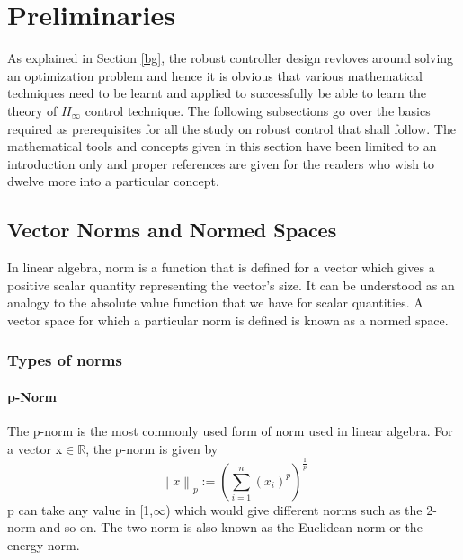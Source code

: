 \documentclass[a4paper,12pt]{article}
\newcommand\norm[1]{\left\lVert#1\right\rVert}
\begin{document}
\section{Preliminaries}

As explained in Section \ref{bg}, the robust controller design revloves around solving an optimization problem and hence it is obvious that various mathematical techniques need to be learnt and applied to successfully be able to learn the theory of $H_{\infty}$ control technique. The following subsections go over the basics required as prerequisites for all the study on robust control that shall follow. The mathematical tools and concepts given in this section have been limited to an introduction only and proper references are given for the readers who wish to dwelve more into a particular concept. 
	\subsection{Vector Norms and Normed Spaces}
	In linear algebra, norm is a function that is defined for a vector which gives a positive scalar quantity representing the vector's size. It can be understood as an analogy to the absolute value function that we have for scalar quantities. A vector space for which  a particular norm is defined is known as a normed space. 
		\subsubsection{Types of norms}
			\paragraph{p-Norm}  The p-norm is the most commonly used form of norm used in linear algebra. For a vector x$\in \mathbb{R}$, the p-norm is given by
				\begin{equation}
					\norm{x}_{p} := \left(\sum\limits_{i=1}^n  (x_{i})^{p}\right)^{\frac{1}{p}}
				\end{equation}
				p can take any value in [1,$\infty$) which would give different norms such as the 2-norm and so on. The two norm is also known as the Euclidean norm or the energy norm.
				
\end{document}
